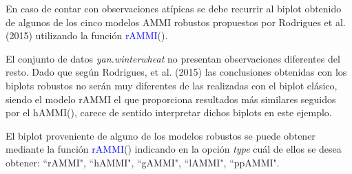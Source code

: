 


En caso de contar con observaciones atípicas se debe recurrir al biplot obtenido de algunos de los cinco modelos AMMI robustos propuestos por Rodrigues et al. (2015) utilizando la función \textcolor{blue}{rAMMI}().

El conjunto de datos \emph{yan.winterwheat} no presentan observaciones diferentes del resto. Dado que según Rodrigues, et al. (2015) las conclusiones obtenidas con los biplots robustos no serán muy diferentes de las realizadas con el biplot clásico, siendo el modelo rAMMI el que proporciona resultados más similares seguidos por el hAMMI(), carece de sentido interpretar dichos biplots en este ejemplo.

El biplot proveniente de alguno de los modelos robustos se puede obtener mediante la función \textcolor{blue}{rAMMI}() indicando en la opción \emph{type} cuál de ellos se desea obtener: ``rAMMI", ``hAMMI", ``gAMMI", ``lAMMI", ``ppAMMI".



